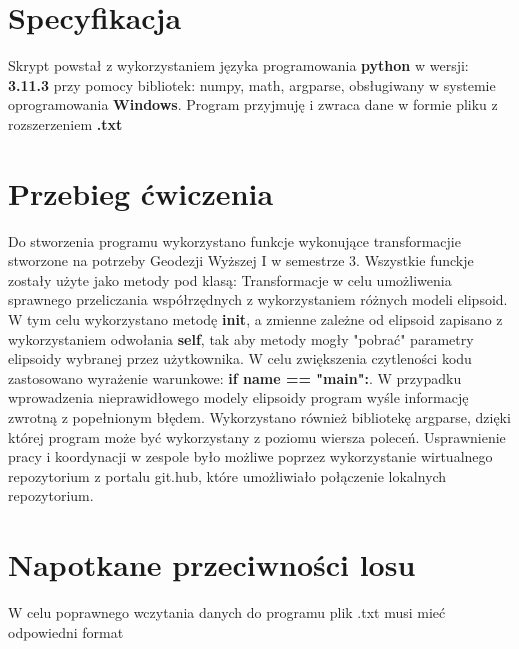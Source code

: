 \section{Specyfikacja}

\begin{flushleft}
	\hspace{1cm}Skrypt powstał z wykorzystaniem języka programowania \textbf{python} w wersji: \textbf{3.11.3} przy pomocy bibliotek: numpy, math, argparse, obsługiwany w systemie oprogramowania \textbf{Windows}. Program przyjmuję i zwraca dane w formie pliku z rozszerzeniem \textbf{.txt}
\end{flushleft}

\section{Przebieg ćwiczenia}

\begin{flushleft}
	\hspace{1cm}Do stworzenia programu wykorzystano funkcje wykonujące transformacjie stworzone na potrzeby Geodezji Wyższej I w semestrze 3. Wszystkie funckje zostały użyte jako metody pod klasą: Transformacje w celu umożliwenia sprawnego przeliczania współrzędnych z wykorzystaniem różnych modeli elipsoid. W tym celu wykorzystano metodę \textbf{init}, a zmienne zależne od elipsoid zapisano z wykorzystaniem odwołania \textbf{self}, tak aby metody mogły "pobrać" parametry elipsoidy wybranej przez użytkownika. W celu zwiększenia czytleności kodu zastosowano wyrażenie warunkowe: \textbf{if name == "main":}. W przypadku wprowadzenia nieprawidłowego modely elipsoidy program wyśle informację zwrotną z popełnionym błędem. Wykorzystano również bibliotekę argparse, dzięki której program może być wykorzystany z poziomu wiersza poleceń. Usprawnienie pracy i koordynacji w zespole było możliwe poprzez wykorzystanie wirtualnego repozytorium z portalu git.hub, które umożliwiało połączenie lokalnych repozytorium.
\end{flushleft}

\section{Napotkane przeciwności losu}

\begin{flushleft}
	\hspace{1cm} W celu poprawnego wczytania danych do programu plik .txt musi mieć odpowiedni format
\end{flushleft}